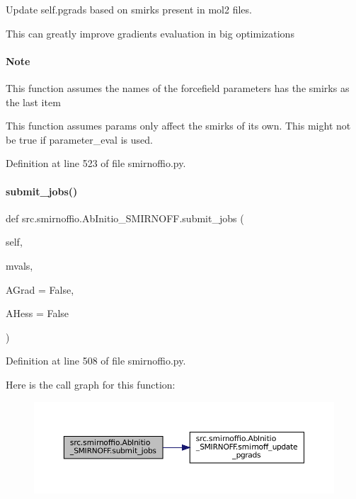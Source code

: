 Update self.\+pgrads based on smirks present in mol2 files. 

This can greatly improve gradients evaluation in big optimizations

\paragraph*{Note }


\begin{DoxyEnumerate}
\item This function assumes the names of the forcefield parameters has the smirks as the last item
\item This function assumes params only affect the smirks of its own. This might not be true if parameter\+\_\+eval is used. 
\end{DoxyEnumerate}

Definition at line 523 of file smirnoffio.\+py.

\mbox{\label{classsrc_1_1smirnoffio_1_1AbInitio__SMIRNOFF_a77a4788e6fad28b4785c0900709cb72d}} 
\paragraph{\texorpdfstring{submit\+\_\+jobs()}{submit\_jobs()}}
{\footnotesize\ttfamily def src.\+smirnoffio.\+Ab\+Initio\+\_\+\+S\+M\+I\+R\+N\+O\+F\+F.\+submit\+\_\+jobs (\begin{DoxyParamCaption}\item[{}]{self,  }\item[{}]{mvals,  }\item[{}]{A\+Grad = {\ttfamily False},  }\item[{}]{A\+Hess = {\ttfamily False} }\end{DoxyParamCaption})}



Definition at line 508 of file smirnoffio.\+py.

Here is the call graph for this function\+:
\nopagebreak
\begin{figure}[H]
\begin{center}
\leavevmode
\includegraphics[width=350pt]{classsrc_1_1smirnoffio_1_1AbInitio__SMIRNOFF_a77a4788e6fad28b4785c0900709cb72d_cgraph}
\end{center}
\end{figure}


